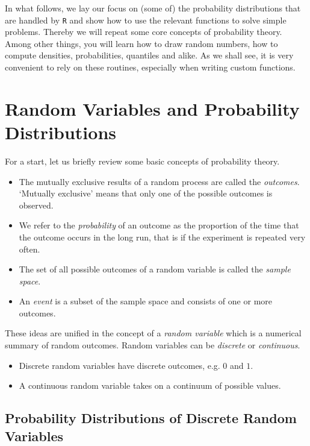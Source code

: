 \documentclass[]{book}
\providecommand{\tightlist}{%
  \setlength{\itemsep}{0pt}\setlength{\parskip}{0pt}}
\theoremstyle{definition}
\theoremstyle{definition}
\theoremstyle{definition}
\theoremstyle{remark}
\begin{document}
In what follows, we lay our focus on (some of) the probability
distributions that are handled by \texttt{R} and show how to use the
relevant functions to solve simple problems. Thereby we will repeat some
core concepts of probability theory. Among other things, you will learn
how to draw random numbers, how to compute densities, probabilities,
quantiles and alike. As we shall see, it is very convenient to rely on
these routines, especially when writing custom functions.

\section{Random Variables and Probability
Distributions}\label{random-variables-and-probability-distributions}

For a start, let us briefly review some basic concepts of probability
theory.

\begin{itemize}
\tightlist
\item
  The mutually exclusive results of a random process are called the
  \emph{outcomes}. `Mutually exclusive' means that only one of the
  possible outcomes is observed.
\item
  We refer to the \emph{probability} of an outcome as the proportion of
  the time that the outcome occurs in the long run, that is if the
  experiment is repeated very often.
\item
  The set of all possible outcomes of a random variable is called the
  \emph{sample space}.
\item
  An \emph{event} is a subset of the sample space and consists of one or
  more outcomes.
\end{itemize}

These ideas are unified in the concept of a \emph{random variable} which
is a numerical summary of random outcomes. Random variables can be
\emph{discrete} or \emph{continuous}.

\begin{itemize}
\tightlist
\item
  Discrete random variables have discrete outcomes, e.g. \(0\) and
  \(1\).
\item
  A continuous random variable takes on a continuum of possible values.
\end{itemize}

\subsection*{Probability Distributions of Discrete Random
Variables}\label{probability-distributions-of-discrete-random-variables}
\end{document}
